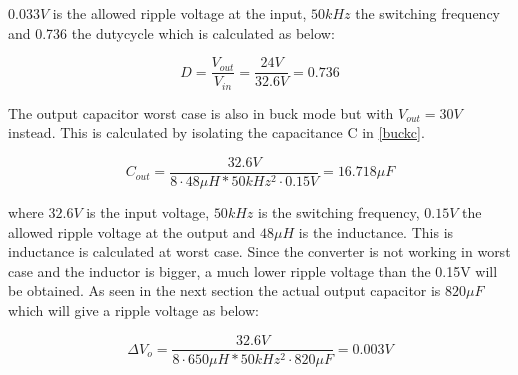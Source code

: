 $0.033V$ is the allowed ripple voltage at the input, $50kHz$ the switching frequency and 0.736 the dutycycle which is calculated as below:

\begin{equation} \label{buckduty}
D = \frac{V_{out}}{V_{in}} = \frac{24V}{32.6V} = 0.736
\end{equation} 


The output capacitor worst case is also in buck mode but with $V_{out}=30V$  instead. This is calculated by isolating the capacitance C in \ref{buckc}. 

\begin{equation} \label{buckc} 
C_{out} = \frac{32.6V}{8\cdot 48\mu H*50kHz^2\cdot 0.15V} = 16.718\mu F
\end{equation}

where $32.6V$ is the input voltage, $50kHz$ is the switching frequency, $0.15V$ the allowed ripple voltage at the output and $48\mu H$ is the inductance. This is inductance is calculated at worst case. 
Since the converter is not working in worst case and the inductor is bigger, a much lower ripple voltage than the 0.15V will be obtained. As seen in the next section the actual output capacitor is $820\mu F$ which will give a ripple voltage as below:

\begin{equation} \label{buckc} 
\Delta V_o = \frac{32.6V}{8\cdot 650\mu H*50kHz^2\cdot 820\mu F} = 0.003V
\end{equation}
   


